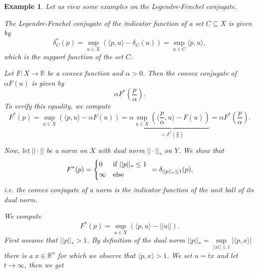 \documentclass[abstracton]{scrreprt}
\newtheorem{example}[theorem]{Example}
\newenvironment{proof}[1][Proof]{\begin{trivlist}
\item[\hskip \labelsep {\bfseries #1}]}{\end{trivlist}}
\begin{document}
        \begin{example}
        \label{ex:legendre_fenchel_conjugate_example}
            Let us view some examples on the Legendre-Fenchel conjugate.
            \begin{enumerate}
                \item The Legendre-Fenchel conjugate of the indicator function of a set $C \subseteq X$ is given by
                    $$
                        \delta^{\ast}_{C}(p) = \sup_{u \in X} \left( \langle p, u \rangle - \delta_{C}(u) \right) = \sup_{u \in C} \langle p, u \rangle,
                    $$
                which is the support function of the set $C$.
                \item Let $F: X \to \mathbb{R}$ be a convex function and $\alpha > 0$. Then the convex conjugate of $\alpha F(u)$ is given by
                    $$
                        \alpha F^{\ast}(\frac{p}{\alpha}).
                    $$
                To verify this equality, we compute
                    $$
                        F^{\ast}(p) = \sup_{u \in X} \left( \langle p, u \rangle - \alpha F(u) \right) = \alpha \underbrace{\sup_{u \in X} \left( \langle \frac{p}{\alpha}, u \rangle - F(u) \right)}_{= F^{\ast}(\frac{p}{\alpha})} = \alpha F^{\ast}(\frac{p}{\alpha}).
                    $$
                \item Now, let $||\cdot||$ be a norm on $X$ with dual norm $||\cdot||_{\ast}$ on $Y$. We show that
                    $$
                        F^{\ast}(p) =
                            \begin{dcases*}
                                0 & \textnormal{if $||p||_{\ast} \le 1$} \\
                                \infty & \textnormal{else}
                            \end{dcases*}
                        = \delta_{||p||_{\ast} \le 1}(p),
                    $$
                i.e. the convex conjugate of a norm is the indicator function of the unit ball of its dual norm.
                \begin{proof}
                    We compute
                        $$
                            F^{\ast}(p) = \sup_{u \in X} \left( \langle p, u \rangle - ||u|| \right).
                        $$
                    First assume that $||p||_{\ast} > 1$. By definition of the dual norm $||p||_{\ast} = \sup\limits_{||x|| \le 1} |\langle p, x \rangle|$ there is a $x \in \mathbb{R}^{n}$ for which we observe that $\langle p, x \rangle > 1$. We set $u = tx$ and let $t \longrightarrow \infty$, then we get

\end{proof}
\end{enumerate}
\end{example}
\end{document}
